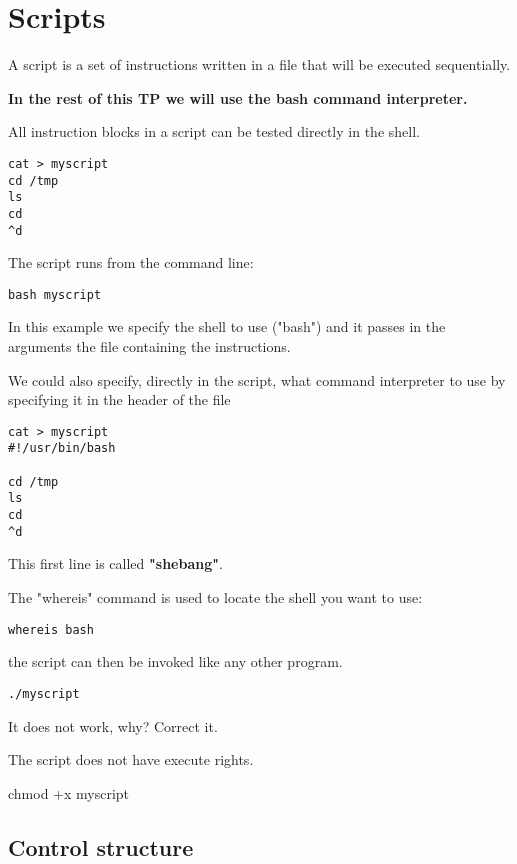 \documentclass[11pt]{article}
\begin{document}
\section{Scripts}

A script is a set of instructions written in a file that will be executed sequentially.

\textbf{In the rest of this TP we will use the bash command interpreter.
}

All instruction blocks in a script can be tested directly in the shell.

\begin{lstlisting}
cat > myscript
cd /tmp
ls
cd
^d
\end{lstlisting}

The script runs from the command line:

\begin{lstlisting}
bash myscript
\end{lstlisting}

In this example we specify the shell to use ("bash") and it passes in the arguments the file containing the instructions.

We could also specify, directly in the script, what command interpreter to use by specifying it in the header of the file

\begin{lstlisting}
cat > myscript
#!/usr/bin/bash

cd /tmp
ls
cd
^d
\end{lstlisting}

This first line is called \textbf{"shebang"}.

The "whereis" command is used to locate the shell you want to use:

\begin{lstlisting}
whereis bash
\end{lstlisting}

the script can then be invoked like any other program.

\begin{lstlisting}
./myscript
\end{lstlisting}

It does not work, why? Correct it.

\begin{solution}
	The script does not have execute rights.
	
	chmod +x myscript
\end{solution}

\subsection{Control structure}
\end{document}
